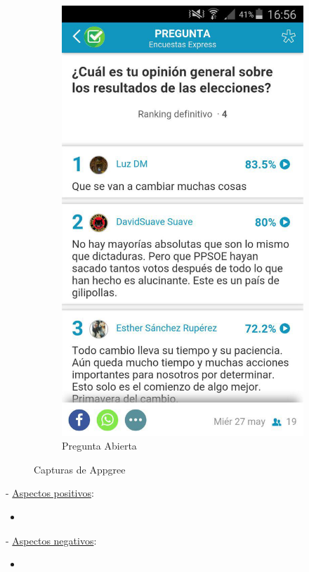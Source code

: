 \begin{figure}[H]
\begin{subfigure}[b]{0.3\textwidth}
                \includegraphics[width=\textwidth]{Media/Captures/appgreeOpenQuestion.jpg}
                \caption{Pregunta Abierta}
                \label{fig:appgreeOpenQuestion}
        \end{subfigure}
        \caption{Capturas de Appgree}\label{fig:appgreeCaptures}
\end{figure}

 - \underline{Aspectos positivos}:

\begin{itemize}
	\item 
\end{itemize}

 - \underline{Aspectos negativos}:

\begin{itemize}
	\item 
\end{itemize}
